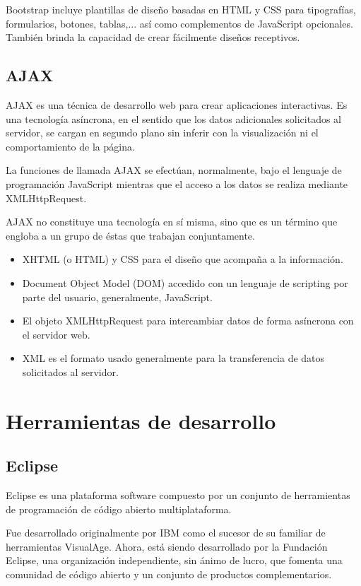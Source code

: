 Bootstrap incluye plantillas de diseño basadas en HTML y CSS para tipografías, formularios, botones, tablas,... así como complementos de JavaScript opcionales. También brinda la capacidad de crear fácilmente diseños receptivos.

\subsection{AJAX}
AJAX es una técnica de desarrollo web para crear aplicaciones interactivas. Es una tecnología asíncrona, en el sentido que los datos adicionales solicitados al servidor, se cargan en segundo plano sin inferir con la visualización ni el comportamiento de la página.

La funciones de llamada AJAX se efectúan, normalmente, bajo el lenguaje de programación JavaScript mientras que el acceso a los datos se realiza mediante XMLHttpRequest.

AJAX no constituye una tecnología en sí misma, sino que es un término que engloba a un grupo de éstas que trabajan conjuntamente.

	\begin{itemize}
		\item XHTML (o HTML) y CSS para el diseño que acompaña a la información.
		\item Document Object Model (DOM) accedido con un lenguaje de scripting por parte del usuario, generalmente, JavaScript.
		\item El objeto XMLHttpRequest para intercambiar datos de forma asíncrona con el servidor web.
		\item XML es el formato usado generalmente para la transferencia de datos solicitados al servidor.
	\end{itemize}
	

\section{Herramientas de desarrollo}
\subsection{Eclipse}
Eclipse es una plataforma software compuesto por un conjunto de herramientas de programación de código abierto multiplataforma.

Fue desarrollado originalmente por IBM como el sucesor de su familiar de herramientas VisualAge. Ahora, está siendo desarrollado por la Fundación Eclipse, una organización independiente, sin ánimo de lucro, que fomenta una comunidad de código abierto y un conjunto de productos complementarios.

